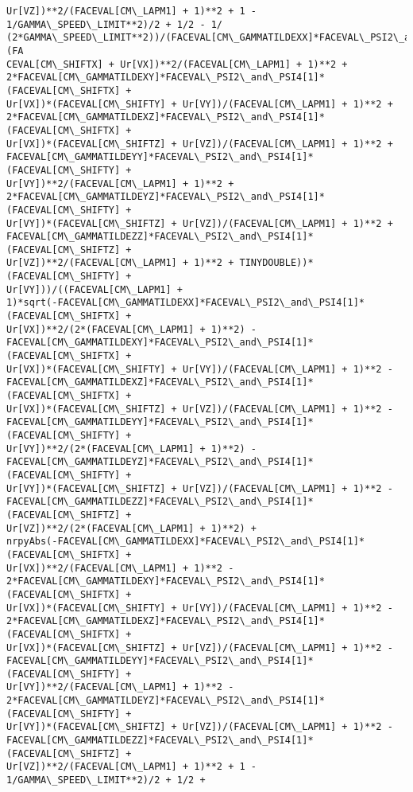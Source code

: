 \documentclass[landscape,letterpaper,10pt,english]{article}
\begin{document}
\begin{Verbatim}[commandchars=\\\{\}]
Ur[VZ])**2/(FACEVAL[CM\_LAPM1] + 1)**2 + 1 - 1/GAMMA\_SPEED\_LIMIT**2)/2 + 1/2 - 1/
(2*GAMMA\_SPEED\_LIMIT**2))/(FACEVAL[CM\_GAMMATILDEXX]*FACEVAL\_PSI2\_and\_PSI4[1]*(FA
CEVAL[CM\_SHIFTX] + Ur[VX])**2/(FACEVAL[CM\_LAPM1] + 1)**2 +
2*FACEVAL[CM\_GAMMATILDEXY]*FACEVAL\_PSI2\_and\_PSI4[1]*(FACEVAL[CM\_SHIFTX] +
Ur[VX])*(FACEVAL[CM\_SHIFTY] + Ur[VY])/(FACEVAL[CM\_LAPM1] + 1)**2 +
2*FACEVAL[CM\_GAMMATILDEXZ]*FACEVAL\_PSI2\_and\_PSI4[1]*(FACEVAL[CM\_SHIFTX] +
Ur[VX])*(FACEVAL[CM\_SHIFTZ] + Ur[VZ])/(FACEVAL[CM\_LAPM1] + 1)**2 +
FACEVAL[CM\_GAMMATILDEYY]*FACEVAL\_PSI2\_and\_PSI4[1]*(FACEVAL[CM\_SHIFTY] +
Ur[VY])**2/(FACEVAL[CM\_LAPM1] + 1)**2 +
2*FACEVAL[CM\_GAMMATILDEYZ]*FACEVAL\_PSI2\_and\_PSI4[1]*(FACEVAL[CM\_SHIFTY] +
Ur[VY])*(FACEVAL[CM\_SHIFTZ] + Ur[VZ])/(FACEVAL[CM\_LAPM1] + 1)**2 +
FACEVAL[CM\_GAMMATILDEZZ]*FACEVAL\_PSI2\_and\_PSI4[1]*(FACEVAL[CM\_SHIFTZ] +
Ur[VZ])**2/(FACEVAL[CM\_LAPM1] + 1)**2 + TINYDOUBLE))*(FACEVAL[CM\_SHIFTY] +
Ur[VY]))/((FACEVAL[CM\_LAPM1] +
1)*sqrt(-FACEVAL[CM\_GAMMATILDEXX]*FACEVAL\_PSI2\_and\_PSI4[1]*(FACEVAL[CM\_SHIFTX] +
Ur[VX])**2/(2*(FACEVAL[CM\_LAPM1] + 1)**2) -
FACEVAL[CM\_GAMMATILDEXY]*FACEVAL\_PSI2\_and\_PSI4[1]*(FACEVAL[CM\_SHIFTX] +
Ur[VX])*(FACEVAL[CM\_SHIFTY] + Ur[VY])/(FACEVAL[CM\_LAPM1] + 1)**2 -
FACEVAL[CM\_GAMMATILDEXZ]*FACEVAL\_PSI2\_and\_PSI4[1]*(FACEVAL[CM\_SHIFTX] +
Ur[VX])*(FACEVAL[CM\_SHIFTZ] + Ur[VZ])/(FACEVAL[CM\_LAPM1] + 1)**2 -
FACEVAL[CM\_GAMMATILDEYY]*FACEVAL\_PSI2\_and\_PSI4[1]*(FACEVAL[CM\_SHIFTY] +
Ur[VY])**2/(2*(FACEVAL[CM\_LAPM1] + 1)**2) -
FACEVAL[CM\_GAMMATILDEYZ]*FACEVAL\_PSI2\_and\_PSI4[1]*(FACEVAL[CM\_SHIFTY] +
Ur[VY])*(FACEVAL[CM\_SHIFTZ] + Ur[VZ])/(FACEVAL[CM\_LAPM1] + 1)**2 -
FACEVAL[CM\_GAMMATILDEZZ]*FACEVAL\_PSI2\_and\_PSI4[1]*(FACEVAL[CM\_SHIFTZ] +
Ur[VZ])**2/(2*(FACEVAL[CM\_LAPM1] + 1)**2) +
nrpyAbs(-FACEVAL[CM\_GAMMATILDEXX]*FACEVAL\_PSI2\_and\_PSI4[1]*(FACEVAL[CM\_SHIFTX] +
Ur[VX])**2/(FACEVAL[CM\_LAPM1] + 1)**2 -
2*FACEVAL[CM\_GAMMATILDEXY]*FACEVAL\_PSI2\_and\_PSI4[1]*(FACEVAL[CM\_SHIFTX] +
Ur[VX])*(FACEVAL[CM\_SHIFTY] + Ur[VY])/(FACEVAL[CM\_LAPM1] + 1)**2 -
2*FACEVAL[CM\_GAMMATILDEXZ]*FACEVAL\_PSI2\_and\_PSI4[1]*(FACEVAL[CM\_SHIFTX] +
Ur[VX])*(FACEVAL[CM\_SHIFTZ] + Ur[VZ])/(FACEVAL[CM\_LAPM1] + 1)**2 -
FACEVAL[CM\_GAMMATILDEYY]*FACEVAL\_PSI2\_and\_PSI4[1]*(FACEVAL[CM\_SHIFTY] +
Ur[VY])**2/(FACEVAL[CM\_LAPM1] + 1)**2 -
2*FACEVAL[CM\_GAMMATILDEYZ]*FACEVAL\_PSI2\_and\_PSI4[1]*(FACEVAL[CM\_SHIFTY] +
Ur[VY])*(FACEVAL[CM\_SHIFTZ] + Ur[VZ])/(FACEVAL[CM\_LAPM1] + 1)**2 -
FACEVAL[CM\_GAMMATILDEZZ]*FACEVAL\_PSI2\_and\_PSI4[1]*(FACEVAL[CM\_SHIFTZ] +
Ur[VZ])**2/(FACEVAL[CM\_LAPM1] + 1)**2 + 1 - 1/GAMMA\_SPEED\_LIMIT**2)/2 + 1/2 +

\end{Verbatim}
\end{document}
